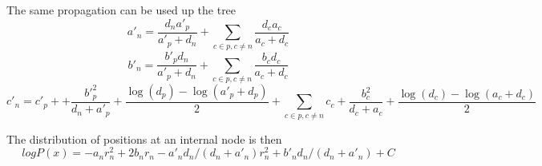 \documentclass[aps,rmp, onecolumn]{revtex4}
\begin{document}
The same propagation can be used up the tree
\begin{equation}
    a'_n  =  \frac{d_n a'_p}{a'_p+d_n} + \sum_{c\in p, c\neq n} \frac{d_c a_c}{a_c+d_c}
\end{equation}
\begin{equation}
    b'_n = \frac{b'_p d_n}{a'_p + d_n} + \sum_{c\in p, c\neq n}\frac{b_c d_c}{a_c + d_c}
\end{equation}
\begin{equation}
    c'_n = c'_p + + \frac{b'_p^2}{d_n + a'_p} + \frac{\log(d_p) - \log(a'_p+d_p)}{2} +  \sum_{c\in p, c\neq n} c_c  + \frac{b_c^2}{d_c + a_c} + \frac{\log(d_c) - \log(a_c+d_c)}{2}
\end{equation}

The distribution of positions at an internal node is then
\begin{equation}
    log P(x) = -a_n r_n^2 + 2 b_n r_n - a'_n d_n/(d_n + a'_n) r_n^2 + b'_n d_n/(d_n + a'_n) + C
\end{equation}
\end{document}
